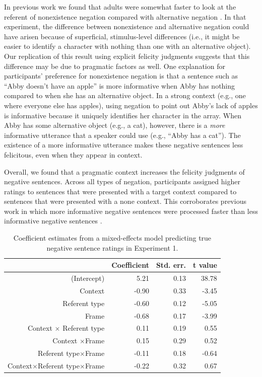 \documentclass[man, noapacite]{apa2}
\begin{document}
In previous work we found that adults were somewhat faster to look at the referent of nonexistence negation compared with alternative negation \cite{nordmeyer2014b}. In that experiment, the difference between nonexistence and alternative negation could have arisen because of superficial, stimulus-level differences (i.e., it might be easier to identify a character with nothing than one with an alternative object). Our replication of this result using explicit felicity judgments suggests that this difference may be due to pragmatic factors as well. One explanation for participants' preference for nonexistence negation is that a sentence such as ``Abby doesn't have an apple'' is more informative when Abby has nothing compared to when she has an alternative object. In a strong context (e.g., one where everyone else has apples), using negation to point out Abby's lack of apples is informative because it uniquely identifies her character in the array. When Abby has some alternative object (e.g., a cat), however, there is a \emph{more} informative utterance that a speaker could use (e.g., ``Abby has a cat''). The existence of a more informative utterance makes these negative sentences less felicitous, even when they appear in context.

Overall, we found that a pragmatic context increases the felicity judgments of negative sentences. Across all types of negation, participants assigned higher ratings to sentences that were presented with a target context compared to sentences that were presented with a none context. This corroborates previous work in which more informative negative sentences were processed faster than less informative negative sentences \cite{nordmeyer2014}.

\begin{table}[t]
\caption{\label{tab:s1} Coefficient estimates from a mixed-effects model predicting true negative sentence ratings in Experiment 1.}
\begin{center}
\small\addtolength{\tabcolsep}{-5pt}
\begin{tabular}{rrrr}
 \hline
 & Coefficient & Std. err. & t value \\
 \hline
(Intercept) & 5.21 & 0.13 & 38.78 \\
 Context & -0.90 & 0.33 & -3.45 \\
 Referent type & -0.60 & 0.12 & -5.05 \\
 Frame & -0.68 & 0.17 & -3.99 \\
 Context $\times$ Referent type & 0.11 & 0.19 & 0.55 \\
 Context $\times$Frame & 0.15 & 0.29 & 0.52 \\
 Referent type$\times$Frame & -0.11 & 0.18 & -0.64 \\
 Context$\times$Referent type$\times$Frame & -0.22 & 0.32 & 0.67 \\
 \hline
\end{tabular}
\end{center}
\end{table}
\end{document}
